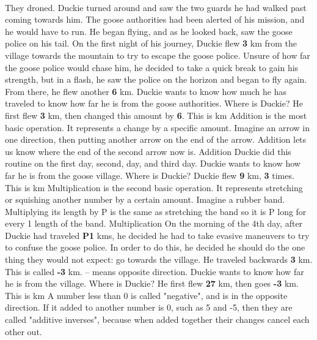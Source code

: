 \documentclass[a4paper,11pt ]{book}
\begin{document}
\paragraph{} They droned. Duckie turned around and saw the two guards he had walked past coming towards him. The goose authorities had been alerted of his mission, and he would have to run. He began flying, and as he looked back, saw the goose police on his tail. 
\vfill
\pagebreak
{On the first night of his journey, Duckie flew \textbf{3} km from the village towards the mountain to try to escape the goose police. Unsure of how far the goose police would chase him, he decided to take a quick break to gain his strength, but in a flash, he saw the police on the horizon and began to fly again. From there, he flew another \textbf{6} km. Duckie wants to know how much he has traveled to know how far he is from the goose authorities. Where is Duckie?}
{He first flew \textbf{3} km, then changed this amount by \textbf{6}. This is  km}
{Addition is the most basic operation. It represents a change by a specific amount. Imagine an arrow in one direction, then putting another arrow on the end of the arrow. Addition lets us know where the end of the second arrow now is.}
{Addition}
{Duckie did this routine on the first day, second, day, and third day.  Duckie wants to know how far he is from the goose village. Where is Duckie?}
{Duckie flew \textbf{9} km, \textbf{3} times. This is  km}
{Multiplication is the second basic operation. It represents stretching or squishing another number by a certain amount. Imagine a rubber band. Multiplying its length by P is the same as stretching the band so it is P long for every 1 length of the band.}
{Multiplication}
{On the morning of the 4th day, after Duckie had traveled \textbf{P1} kms, he decided he had to take evasive maneuvers to try to confuse the goose police. In order to do this, he decided he should do the one thing they would not expect: go towards the village. He traveled backwards \textbf{3} km. This is called \textbf{-3} km. \linebreak – means opposite direction. Duckie wants to know how far he is from the village. Where is Duckie?}
{He first flew \textbf{27} km, then goes \textbf{-3} km. This is  km}
{A number less than 0 is called "negative", and is in the opposite direction. If it added to another number is 0, such as 5 and -5, then they are called "additive inverses", because when added together their changes cancel each other out.}
\end{document}
